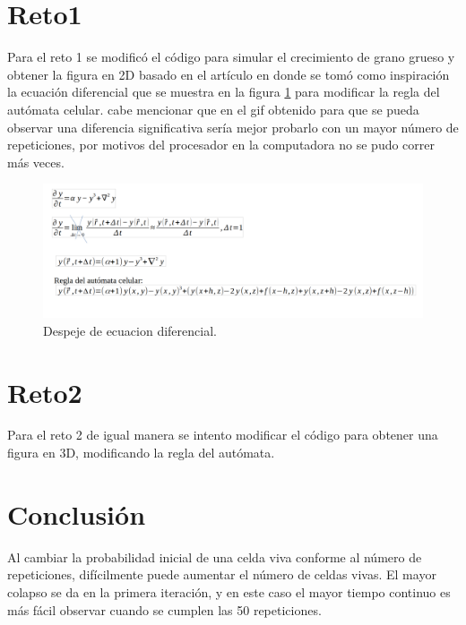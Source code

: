 \documentclass{article}
\begin{document}
\section{Reto1}\label{ret}

Para el reto 1 se modific\'o el c\'odigo para simular el crecimiento de grano grueso y obtener la figura en 2D basado en el art\'iculo \cite{ret1} en donde se tom\'o como inspiraci\'on la ecuaci\'on diferencial que se muestra en la figura \ref{f2} para modificar la regla del aut\'omata celular. cabe mencionar que en el gif obtenido \cite{ana1} para que se pueda observar una diferencia significativa ser\'ia mejor probarlo con un mayor n\'umero de repeticiones, por motivos del procesador en la computadora no se pudo correr m\'as veces.

\begin{figure}
  \begin{center}
    \includegraphics[width=15cm]{ecuaciones.png}
  \end{center}
  \caption{Despeje de ecuacion diferencial.}
  \label{f2}
\end{figure}


\section{Reto2}\label{reto}

Para el reto 2 de igual manera se intento modificar el c\'odigo para obtener una figura en 3D, modificando la regla del aut\'omata.

  \section{Conclusi\'{o}n}\label{con}
 Al cambiar la probabilidad inicial de una celda viva conforme al n\'umero de repeticiones, dif\'icilmente puede aumentar el n\'umero de celdas vivas.
El mayor colapso se da en la primera iteraci\'on, y en este caso el mayor tiempo continuo es m\'as f\'acil observar cuando se cumplen las 50 repeticiones.

  
  
\end{document}
